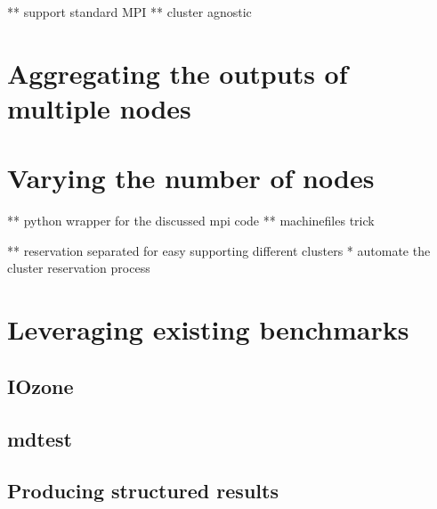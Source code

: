 ** support standard MPI
** cluster agnostic


\section{Aggregating the outputs of multiple nodes}




\section{Varying the number of nodes}

** python wrapper for the discussed mpi code
** machinefiles trick


** reservation separated for easy supporting different clusters
* automate the cluster reservation process


\section{Leveraging existing benchmarks}


\subsection{IOzone}


\subsection{mdtest}





\subsection{Producing structured results}



